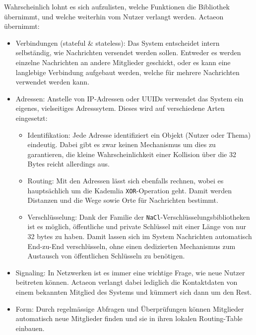 \documentclass[11pt]{article}
\begin{document}
\noindent Wahrscheinlich lohnt es sich aufzulisten, welche Funktionen
die Bibliothek übernimmt, und welche weiterhin vom Nutzer verlangt
werden. Actaeon übernimmt:
\begin{itemize}
\item Verbindungen (stateful \& stateless): Das System entscheidet intern
selbständig, wie Nachrichten versendet werden sollen. Entweder es
werden einzelne Nachrichten an andere Mitglieder geschickt, oder es
kann eine langlebige Verbindung aufgebaut werden, welche für mehrere
Nachrichten verwendet werden kann.
\item Adressen: Anstelle von IP-Adressen oder UUIDs verwendet das System
ein eigenes, vielseitiges Adresssytem. Dieses wird auf verschiedene
Arten eingesetzt:
\begin{itemize}
\item Identifikation: Jede Adresse identifiziert ein Objekt (Nutzer oder
Thema) eindeutig. Dabei gibt es zwar keinen Mechanismus um dies zu
garantieren, die kleine Wahrscheinlichkeit einer Kollision über
die 32 Bytes reicht allerdings aus.
\item Routing: Mit den Adressen lässt sich ebenfalls rechnen, wobei es
hauptsächlich um die Kademlia \texttt{XOR}-Operation geht. Damit werden
Distanzen und die Wege sowie Orte für Nachrichten bestimmt.
\item Verschlüsselung: Dank der Familie der
\texttt{NaCl}-Verschlüsselungsbibliotheken ist es möglich, öffentliche und
private Schlüssel mit einer Länge von nur 32 bytes zu haben. Damit
lassen sich im System Nachrichten automatisch End-zu-End
verschlüsseln, ohne einen dedizierten Mechanismus zum Austausch
von öffentlichen Schlüsseln zu benötigen.
\end{itemize}
\item Signaling: In Netzwerken ist es immer eine wichtige Frage, wie neue
Nutzer beitreten können. Actaeon verlangt dabei lediglich die
Kontaktdaten von einem bekannten Mitglied des Systems und kümmert
sich dann um den Rest.
\item Form: Durch regelmässige Abfragen und Überprüfungen können
Mitglieder automatisch neue Mitglieder finden und sie in ihren
lokalen Routing-Table einbauen.
\end{itemize}
\end{document}
